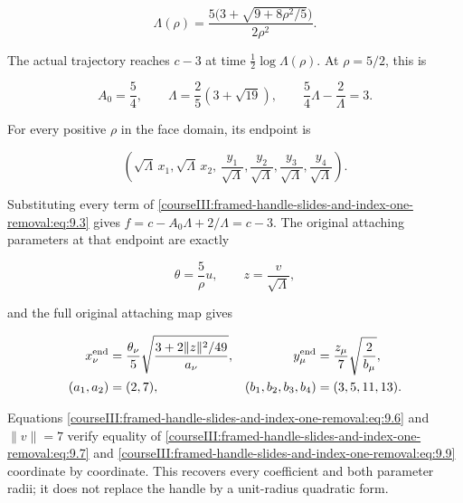 \begin{equation}
\Lambda(\rho)
  =\frac{5\bigl(3+\sqrt{9+8\rho^2/5}\bigr)}{2\rho^2}.
 \label{courseIII:framed-handle-slides-and-index-one-removal:eq:9.5}
\end{equation}

The actual trajectory reaches \(c-3\) at time
\(\frac12\log\Lambda(\rho)\). At \(\rho=5/2\), this is

\begin{equation}
A_0=\frac54,\qquad
 \Lambda=\frac25(3+\sqrt{19}),\qquad
 \frac54\Lambda-\frac2\Lambda=3 .
 \label{courseIII:framed-handle-slides-and-index-one-removal:eq:9.6}
\end{equation}

For every positive \(\rho\) in the face domain, its endpoint is

\begin{equation}
\left(
   \sqrt{\Lambda}\,x_1,\sqrt{\Lambda}\,x_2,\,
   \frac{y_1}{\sqrt{\Lambda}},
   \frac{y_2}{\sqrt{\Lambda}},
   \frac{y_3}{\sqrt{\Lambda}},
   \frac{y_4}{\sqrt{\Lambda}}
 \right).
 \label{courseIII:framed-handle-slides-and-index-one-removal:eq:9.7}
\end{equation}

Substituting every term of \eqref{courseIII:framed-handle-slides-and-index-one-removal:eq:9.3} gives
\(f=c-A_0\Lambda+2/\Lambda=c-3\).
The original attaching parameters at that endpoint are exactly

\begin{equation}
\theta=\frac5\rho u,\qquad z=\frac{v}{\sqrt{\Lambda}},
 \label{courseIII:framed-handle-slides-and-index-one-removal:eq:9.8}
\end{equation}

and the full original attaching map gives

\begin{equation}
\begin{aligned}
 x_\nu^{\rm end}
  &=\frac{\theta_\nu}{5}
       \sqrt{\frac{3+2\|z\|^2/49}{a_\nu}},
 & y_\mu^{\rm end}
  &=\frac{z_\mu}{7}\sqrt{\frac2{b_\mu}},\\
 (a_1,a_2)&=(2,7),
 & (b_1,b_2,b_3,b_4)&=(3,5,11,13).
 \end{aligned}
 \label{courseIII:framed-handle-slides-and-index-one-removal:eq:9.9}
\end{equation}

Equations \eqref{courseIII:framed-handle-slides-and-index-one-removal:eq:9.6} and \(\|v\|=7\) verify equality of \eqref{courseIII:framed-handle-slides-and-index-one-removal:eq:9.7} and \eqref{courseIII:framed-handle-slides-and-index-one-removal:eq:9.9} coordinate by coordinate. This recovers every coefficient and both parameter radii; it does not replace the handle by a unit-radius quadratic form.

